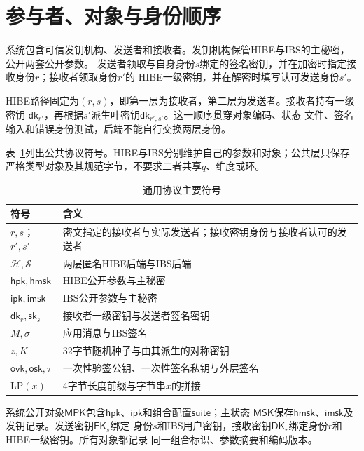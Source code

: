 \section{参与者、对象与身份顺序}

系统包含可信发钥机构、发送者和接收者。发钥机构保管HIBE与IBS的主秘密，公开两套公开参数。
发送者领取与自身身份$s$绑定的签名密钥，并在加密时指定接收身份$r$；接收者领取身份$r'$的
HIBE一级密钥，并在解密时填写认可发送身份$s'$。

HIBE路径固定为$(r,s)$，即第一层为接收者，第二层为发送者。接收者持有一级密钥
$\mathsf{dk}_{r'}$，再根据$s'$派生叶密钥$\mathsf{dk}_{r',s'}$。这一顺序贯穿对象编码、状态
文件、签名输入和错误身份测试，后端不能自行交换两层身份。

表~\ref{tab:notations}列出公共协议符号。HIBE与IBS分别维护自己的参数和对象；公共层只保存
严格类型对象及其规范字节，不要求二者共享$q$、维度或环。

\begin{table}[H]
\centering\small
\caption{通用协议主要符号}
\label{tab:notations}
\begin{tabularx}{\textwidth}{@{}p{}X@{}}
\toprule
\rowcolor{black!8} 符号 & 含义 \\
\midrule
$r,s$；$r',s'$ & 密文指定的接收者与实际发送者；接收密钥身份与接收者认可的发送者 \\
$\mathcal H,\mathcal S$ & 两层匿名HIBE后端与IBS后端 \\
$\mathsf{hpk},\mathsf{hmsk}$ & HIBE公开参数与主秘密 \\
$\mathsf{ipk},\mathsf{imsk}$ & IBS公开参数与主秘密 \\
$\mathsf{dk}_r,\mathsf{sk}_s$ & 接收者一级密钥与发送者签名密钥 \\
$M,\sigma$ & 应用消息与IBS签名 \\
$z,K$ & 32字节随机种子与由其派生的对称密钥 \\
$\mathsf{ovk},\mathsf{osk},\tau$ & 一次性验签公钥、一次性签名私钥与外层签名 \\
$\mathrm{LP}(x)$ & 4字节长度前缀与字节串$x$的拼接 \\
\bottomrule
\end{tabularx}
\end{table}

系统公开对象$\mathsf{MPK}$包含$\mathsf{hpk}$、$\mathsf{ipk}$和组合配置$\mathsf{suite}$；主状态
$\mathsf{MSK}$保存$\mathsf{hmsk}$、$\mathsf{imsk}$及发钥记录。发送密钥$\mathsf{EK}_s$绑定
身份$s$和IBS用户密钥，接收密钥$\mathsf{DK}_r$绑定身份$r$和HIBE一级密钥。所有对象都记录
同一组合标识、参数摘要和编码版本。

